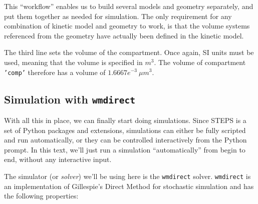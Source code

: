 \documentclass[a4paper,12pt]{book}
\begin{document}
This ``workflow'' enables us to build several models and geometry separately, and put them together as needed for simulation. The only requirement for any combination of kinetic model and geometry to work, is that the volume systems referenced from the geometry have actually been defined in the kinetic model.

The third line sets the volume of the compartment. Once again, SI units must be used, meaning that the volume is specified in $m^3$. The volume of compartment \texttt{'comp'} therefore has a volume of $1.6667e^{-3}\ \mu m^3$. 

\subsection{Simulation with \texttt{wmdirect}}

With all this in place, we can finally start doing simulations. Since STEPS is a set of Python packages and extensions, simulations can either be fully scripted and run automatically, or they can be controlled interactively from the Python prompt. In this text, we'll just run a simulation ``automatically'' from begin to end, without any interactive input. 

The simulator (or \emph{solver}) we'll be using here is the \texttt{wmdirect} solver. \texttt{wmdirect} is an implementation of Gillespie's Direct Method \cite{Gillespie:JPhysChem:1977} for stochastic simulation and has the following properties:
\end{document}
